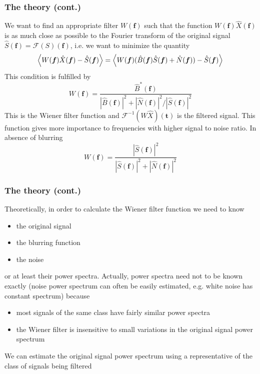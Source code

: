 \documentclass[10pt]{beamer}
\begin{document}
\begin{frame}
  \frametitle{The theory (cont.)}
  We want to find an appropriate filter \(W(\bm{f})\) such that the function
  \(W(\bm{f})\hat{X}(\bm{f})\) is as much close as possible to the Fourier
  transform of the original signal \(\hat{S}(\bm{f}) = \mathcal{F}(S)(\bm{f})\),
  i.e. we want to minimize the quantity
  \begin{equation*}
    \Braket{W(\bm{f})\hat{X}(\bm{f}) - \hat{S}(\bm{f})} =
    \Braket{W(\bm{f})(\hat{B}(\bm{f})\hat{S}(\bm{f}) + \hat{N}(\bm{f})) -
      \hat{S}(\bm{f})}
  \end{equation*}
  This condition is fulfilled by
  \begin{equation*}
    W(\bm{f}) = \frac{\hat{B}^{*}(\bm{f})}{|\hat{B}(\bm{f})|^{2} +
      |\hat{N}(\bm{f})|^{2}/|\hat{S}(\bm{f})|^{2}}
  \end{equation*}
  This is the \alert{Wiener filter} function and
  \(\mathcal{F}^{-1}(W\hat{X})(\bm{t})\) is the \alert{filtered signal}.  This
  function gives more importance to frequencies with \alert{higher signal to
    noise ratio}.  In absence of blurring
  \begin{equation*}
    W(\bm{f}) = \frac{|\hat{S}(\bm{f})|^{2}}{|\hat{S}(\bm{f})|^{2} +
      |\hat{N}(\bm{f})|^{2}}
  \end{equation*}
\end{frame}

\begin{frame}
  \frametitle{The theory (cont.)}
  Theoretically, in order to calculate the Wiener filter function we need to
  know
  \begin{itemize}
  \item the original signal
  \item the blurring function
  \item the noise
  \end{itemize}
  or at least their power spectra.  Actually, power spectra need not to be known
  exactly (noise power spectrum can often be easily estimated, e.g. white noise
  has constant spectrum) because
  \begin{itemize}
  \item most signals of the same class have fairly similar power spectra
  \item the Wiener filter is insensitive to small variations in the original
    signal power spectrum
  \end{itemize}
  We can estimate the original signal power spectrum using a representative of
  the class of signals being filtered
\end{frame}
\end{document}
